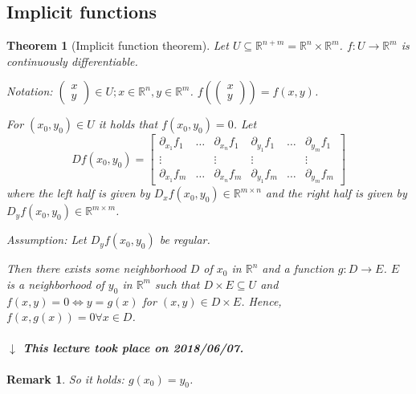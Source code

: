 \documentclass{article}
\newtheorem{theorem}{Theorem}  \numberwithin{theorem}{section}
\newtheorem{remark}{Remark}  \numberwithin{remark}{section}
\newcommand{\dateref}[1]{%
  \begin{mdframed}[backgroundcolor=gray!10,innerbottommargin=0pt,innertopmargin=0pt]
    \paragraph{\textit{$\downarrow$ This lecture took place on #1.}}%
  \end{mdframed}%
}
\newcommand{\vectwo}[2]{\begin{pmatrix} #1 \\ #2 \end{pmatrix}}
\begin{document}
\subsection{Implicit functions}
\begin{theorem}[Implicit function theorem] %
  Let $U \subseteq \mathbb R^{n + m} = \mathbb R^n \times \mathbb R^m$.
  $f: U \to \mathbb R^m$ is continuously differentiable.

  \emph{Notation:} $\vectwo xy \in U; x \in \mathbb R^n, y \in \mathbb R^m$. $f\left(\vectwo xy\right) = f(x, y)$.
  
  For $(x_0, y_0) \in U$ it holds that $f(x_0, y_0) = 0$.
  Let
  \[
    Df(x_0, y_0) = \begin{bmatrix}
      \partial_{x_1} f_1 & \dots & \partial_{x_n} f_1 & \partial_{y_1} f_1 & \dots & \partial_{y_m} f_1 \\
      \vdots & & \vdots & \vdots & & \vdots \\
      \partial_{x_1} f_m & \dots & \partial_{x_n} f_m & \partial_{y_1} f_m & \dots & \partial_{y_m} f_m
    \end{bmatrix}
  \]
  where the left half is given by $D_x f(x_0, y_0) \in \mathbb R^{m \times n}$ and the right half is given by $D_y f(x_0, y_0) \in \mathbb R^{m \times m}$.
  
  Assumption: Let $D_y f(x_0, y_0)$ be regular.
  
  Then there exists some neighborhood $D$ of $x_0$ in $\mathbb R^n$ and a function $g: D \to E$.
  $E$ is a neighborhood of $y_0$ in $\mathbb R^m$ such that $D \times E \subseteq U$ and $f(x,y) = 0 \iff y = g(x)$ for $(x, y) \in D \times E$.
  Hence, $f(x, g(x)) = 0 \forall x \in D$.
\end{theorem}

\dateref{2018/06/07}

\begin{remark}
  So it holds: $g(x_0) = y_0$.
\end{remark}
\end{document}
